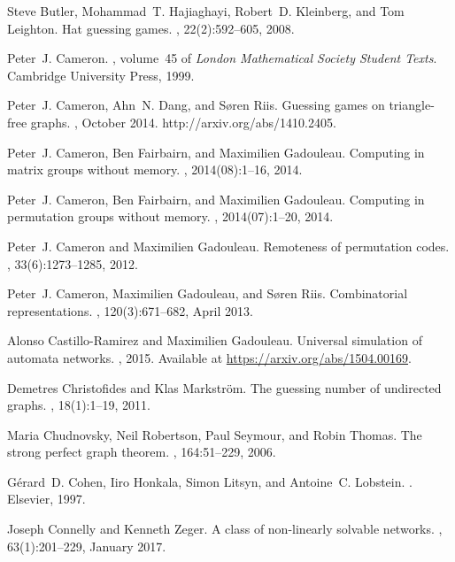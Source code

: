 \documentclass[a4paper, 11pt]{book}
\numberwithin{equation}{section}
\theoremstyle{plain}
\renewcommand{\(}{\ldbrack}
\renewcommand{\)}{\rdbrack}
\begin{document}
\begin{thebibliography}{100}
Steve Butler, Mohammad~T. Hajiaghayi, Robert~D. Kleinberg, and Tom Leighton.
\newblock Hat guessing games.
, 22(2):592--605, 2008.

Peter~J. Cameron.
, volume~45 of {\em London Mathematical
  Society Student Texts}.
\newblock Cambridge University Press, 1999.

Peter~J. Cameron, Ahn~N. Dang, and S\o{}ren Riis.
\newblock Guessing games on triangle-free graphs.
, October 2014.
\newblock http://arxiv.org/abs/1410.2405.

Peter~J. Cameron, Ben Fairbairn, and Maximilien Gadouleau.
\newblock Computing in matrix groups without memory.
,
  2014(08):1--16, 2014.

Peter~J. Cameron, Ben Fairbairn, and Maximilien Gadouleau.
\newblock Computing in permutation groups without memory.
,
  2014(07):1--20, 2014.

Peter~J. Cameron and Maximilien Gadouleau.
\newblock Remoteness of permutation codes.
, 33(6):1273--1285, 2012.

Peter~J. Cameron, Maximilien Gadouleau, and S\o{}ren Riis.
\newblock Combinatorial representations.
, 120(3):671--682,
  April 2013.

Alonso Castillo-Ramirez and Maximilien Gadouleau.
\newblock Universal simulation of automata networks.
, 2015.
\newblock Available at \url{https://arxiv.org/abs/1504.00169}.

Demetres Christofides and Klas Markstr\"{o}m.
\newblock The guessing number of undirected graphs.
, 18(1):1--19, 2011.

Maria Chudnovsky, Neil Robertson, Paul Seymour, and Robin Thomas.
\newblock The strong perfect graph theorem.
, 164:51--229, 2006.

G\'erard~D. Cohen, Iiro Honkala, Simon Litsyn, and Antoine~C. Lobstein.
.
\newblock Elsevier, 1997.

Joseph Connelly and Kenneth Zeger.
\newblock A class of non-linearly solvable networks.
, 63(1):201--229,
  January 2017.


\end{thebibliography}
\end{document}
